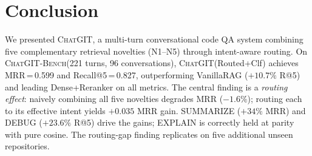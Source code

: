 \documentclass[conference]{IEEEtran}
\newcommand{\chatgit}{\textsc{ChatGIT}\xspace}
\newcommand{\conv}{\textsc{ChatGIT-Bench}\xspace}
\begin{document}
\section{Conclusion}

We presented \chatgit, a multi-turn conversational code QA system
combining five complementary retrieval novelties (N1--N5) through
intent-aware routing. On \conv (221 turns, 96 conversations),
\chatgit (Routed+Clf) achieves MRR\,=\,0.599 and Recall@5\,=\,0.827,
outperforming VanillaRAG ($+10.7\%$ R@5) and leading Dense+Reranker
on all metrics. The central finding is a \emph{routing effect}:
naively combining all five novelties degrades MRR ($-1.6\%$); routing
each to its effective intent yields $+0.035$ MRR gain. SUMMARIZE
($+34\%$ MRR) and DEBUG ($+23.6\%$ R@5) drive the gains; EXPLAIN
is correctly held at parity with pure cosine. The routing-gap finding
replicates on five additional unseen repositories.
\end{document}
